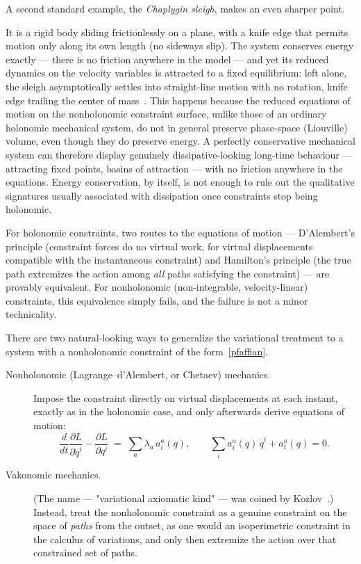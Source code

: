 A second standard example, the \emph{Chaplygin sleigh}, makes an
even sharper point.

It is a rigid body sliding frictionlessly on a
plane, with a knife edge that permits motion only along its own
length (no sideways slip). The system conserves energy exactly ---
there is no friction anywhere in the model --- and yet its reduced
dynamics on the velocity variables is attracted to a fixed
equilibrium: left alone, the sleigh asymptotically settles into
straight-line motion with no rotation, knife edge trailing the
center of mass~\cite{chaplygin}. This
happens because the reduced equations of motion on the nonholonomic
constraint surface, unlike those of an ordinary holonomic mechanical
system, do not in general preserve phase-space (Liouville) volume,
even though they do preserve energy. A perfectly conservative
mechanical system can therefore display genuinely dissipative-looking
long-time behaviour --- attracting fixed points, basins of
attraction --- with no friction anywhere in the equations. Energy
conservation, by itself, is not enough to rule out the qualitative
signatures usually associated with dissipation once constraints stop
being holonomic.

For holonomic constraints, two routes to the equations of motion ---
D'Alembert's principle (constraint forces do no virtual work, for
virtual displacements compatible with the instantaneous constraint)
and Hamilton's principle (the true path extremizes the action among
\emph{all} paths satisfying the constraint) --- are provably
equivalent. For nonholonomic (non-integrable, velocity-linear)
constraints, this equivalence simply fails, and the failure is not a
minor technicality.

There are two natural-looking ways to generalize the variational
treatment to a system with a nonholonomic constraint of the
form~\eqref{pfaffian}.

\begin{description}
  \item[Nonholonomic (Lagrange--d'Alembert, or Chetaev) mechanics.]
  Impose the constraint directly on virtual displacements at each
  instant, exactly as in the holonomic case, and only afterwards
  derive equations of motion:
  \begin{equation}
    \frac{d}{dt}\frac{\partial L}{\partial \dot q^i}
    - \frac{\partial L}{\partial q^i}
    \;=\; \sum_a \lambda_a\, a_i^a(q),
    \qquad
    \sum_i a_i^a(q)\,\dot q^i + a_t^a(q) = 0 .
    \label{lagrange-dalembert}
  \end{equation}
  \item[Vakonomic mechanics.] (The name --- "variational axiomatic
  kind" --- was coined by Kozlov~\cite{kozlov}.)
  Instead, treat the nonholonomic constraint as a genuine constraint
  on the space of \emph{paths} from the outset, as one would an
  isoperimetric constraint in the calculus of variations, and only
  then extremize the action over that constrained set of paths.
\end{description}

